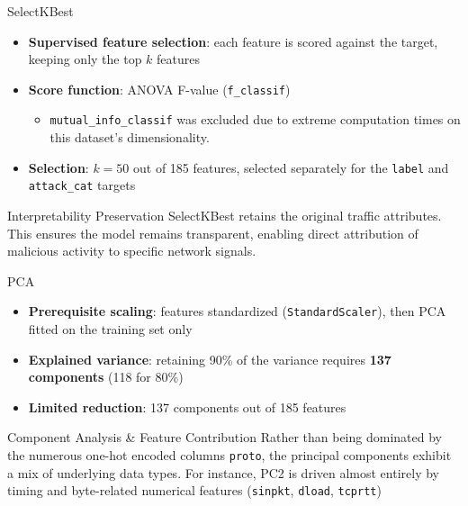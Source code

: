 \documentclass{beamer}
\begin{document}
\begin{frame}{SelectKBest}
  \begin{itemize}
    \item \textbf{Supervised feature selection}: each feature is scored against the
      target, keeping only the top $k$ features
\item \textbf{Score function}: ANOVA F-value (\texttt{f\_classif})
      \begin{itemize}
        \item \texttt{mutual\_info\_classif} was excluded due to extreme
          computation times on this dataset's dimensionality.
      \end{itemize}
    \item \textbf{Selection}: $k = 50$ out of 185 features, selected separately for the
      \texttt{label} and \texttt{attack\_cat} targets
  \end{itemize}
  \vspace{0.3cm}
  \begin{block}{Interpretability Preservation}
    SelectKBest retains the original traffic attributes. This ensures the model remains transparent, enabling direct attribution of malicious activity to specific network signals.
  \end{block}
\end{frame}

\begin{frame}{PCA}
  \begin{itemize}
    \item \textbf{Prerequisite scaling}: features standardized (\texttt{StandardScaler}), then PCA fitted
      on the training set only
    \item \textbf{Explained variance}: retaining 90\% of the variance requires \textbf{137 components} (118 for 80\%) 
    \item \textbf{Limited reduction}: 137 components out of 185 features
  \end{itemize}
  \vspace{0.3cm}
  \begin{block}{Component Analysis \& Feature Contribution}
    Rather than being dominated by the numerous one-hot encoded columns \texttt{proto}, the principal components exhibit a mix of underlying data types. For instance, PC2 is driven almost entirely by timing and byte-related numerical features (\texttt{sinpkt}, \texttt{dload}, \texttt{tcprtt})
  \end{block}
\end{frame}
\end{document}

